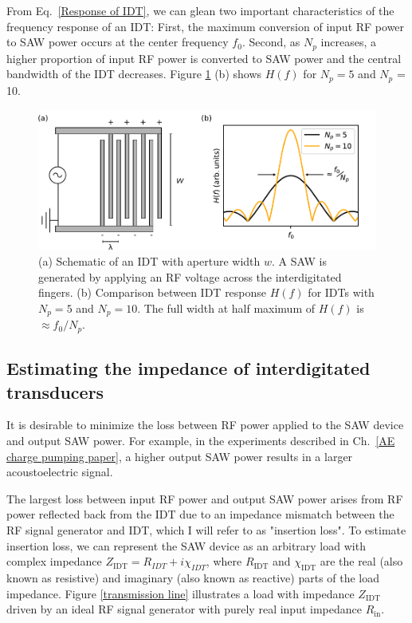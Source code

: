 \documentclass{beavtex_dub_edit}
\begin{document}
From Eq.\ \ref{Response of IDT}, we can glean two important characteristics of the frequency response of an IDT: First, the maximum conversion of input RF power to SAW power occurs at the center frequency $f_0$. Second, as $N_p$ increases, a higher proportion of input RF power is converted to SAW power and the central bandwidth of the IDT decreases. Figure \ref{SAW diagram} (b) shows $H(f)$ for $N_p = 5$ and $N_p$ = 10.

\begin{figure}
    \includegraphics[width = 1\textwidth]{SAW diagram.pdf}
    \caption[(a) Schematic of an IDT with aperture width $w$. A SAW is generated by applying an RF voltage across the interdigitated fingers. (b) Comparison between IDT response $H(f)$ for IDTs with $N_p = 5$ and $N_p = 10$.]{(a) Schematic of an IDT with aperture width $w$. A SAW is generated by applying an RF voltage across the interdigitated fingers. (b) Comparison between IDT response $H(f)$ for IDTs with $N_p = 5$ and $N_p = 10$. The full width at half maximum of $H(f)$ is $\approx f_0/N_p$.}
    \label{SAW diagram}
\end{figure}


\subsection{Estimating the impedance of interdigitated transducers}

It is desirable to minimize the loss between RF power applied to the SAW device and output SAW power. For example, in the experiments described in Ch.\ \ref{AE charge pumping paper}, a higher output SAW power results in a larger acoustoelectric signal. 

The largest loss between input RF power and output SAW power arises from RF power reflected back from the IDT due to an impedance mismatch between the RF signal generator and IDT, which I will refer to as "insertion loss". To estimate insertion loss, we can represent the SAW device as an arbitrary load with complex impedance $Z_{\mathrm{IDT}} = R_{IDT} + i\chi_{IDT}$, where $R_{\mathrm{IDT}}$ and $\chi_{\mathrm{IDT}}$ are the real (also known as resistive) and imaginary (also known as reactive) parts of the load impedance. Figure \ref{transmission line} illustrates a load with impedance $Z_{\mathrm{IDT}}$ driven by an ideal RF signal generator with purely real input impedance $R_{\mathrm{in}}$.
\end{document}
